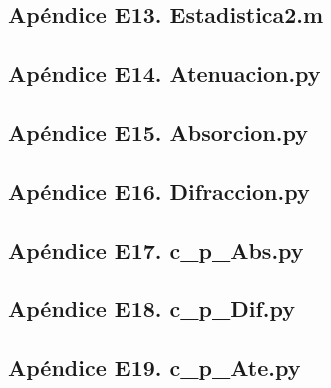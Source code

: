 \subsection{\footnotesize Ap\'endice E13. Estadistica2.m}\label{app:appE13}


\subsection{\footnotesize Ap\'endice E14. Atenuacion.py}\label{app:appE14}
    

\subsection{\footnotesize Ap\'endice E15. Absorcion.py}\label{app:appE15}
 

\subsection{\footnotesize Ap\'endice E16. Difraccion.py}\label{app:appE16}
 

\subsection{\footnotesize Ap\'endice E17. c\_p\_Abs.py}\label{app:appE17}
    

\subsection{\footnotesize Ap\'endice E18. c\_p\_Dif.py}\label{app:appE18}
 

\subsection{\footnotesize Ap\'endice E19. c\_p\_Ate.py}\label{app:appE19}
 

